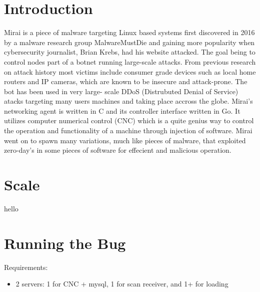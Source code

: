 \documentclass[12pt, letterpaper]{article}
\begin{document}
\begin{sloppypar}



\section*{Introduction}
\begin{flushleft}
Mirai is a piece of malware targeting Linux based systems first discovered in 2016 by 
a malware research group MalwareMustDie and gaining more popularity when cybersecurity 
journalist, Brian Krebs, had his website attacked. The goal being to control nodes
part of a botnet running large-scale attacks. From previous research on attack history
most victims include consumer grade devices such as local home routers and IP cameras, 
which are known to be insecure and attack-prone. The bot has been used in very large-
scale DDoS (Distrubuted Denial of Service) atacks targeting many users machines and 
taking place accross the globe. Mirai's networking agent is written in C and its 
controller interface written in Go. It utilizes computer numerical control (CNC) which 
is a quite genius way to control the operation and functionality of a machine through
injection of software. Mirai went on to spawn many variations, much like pieces of 
malware, that exploited zero-day's in some pieces of software for effecient and 
malicious operation.


\end{flushleft}

\section*{Scale}
\begin{flushleft}
hello


\end{flushleft}


\section*{Running the Bug}
\begin{flushleft}

Requirements: \\
\begin{itemize}
\item 2 servers: 1 for CNC + mysql, 1 for scan receiver, and 1+ for loading
\end{itemize}


\end{flushleft}
\end{sloppypar}
\end{document}
